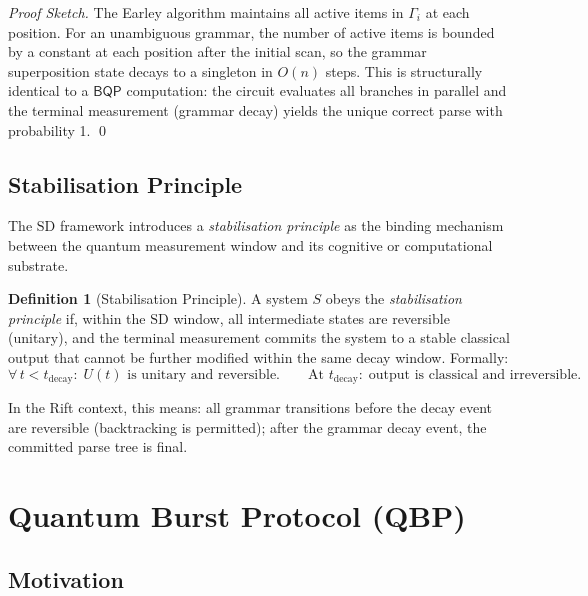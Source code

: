 \documentclass[12pt, a4paper]{article}
\theoremstyle{plain}
\theoremstyle{definition}
\newtheorem{definition}[theorem]{Definition}
\theoremstyle{remark}
\newcommand{\bqp}{\ensuremath{\mathsf{BQP}}}
\newcommand{\SD}{\ensuremath{\mathrm{SD}}}   %
\begin{document}
\begin{proof}[Proof Sketch]
  The Earley algorithm maintains all active items in $\Gamma_i$ at each
  position.  For an unambiguous grammar, the number of active items is
  bounded by a constant at each position after the initial scan, so the
  grammar superposition state decays to a singleton in $O(n)$ steps.  This
  is structurally identical to a $\bqp$ computation: the circuit evaluates
  all branches in parallel and the terminal measurement (grammar decay)
  yields the unique correct parse with probability 1. \qed
\end{proof}

\subsection{Stabilisation Principle}

The \SD{} framework introduces a \emph{stabilisation principle} as the
binding mechanism between the quantum measurement window and its cognitive
or computational substrate.

\begin{definition}[Stabilisation Principle]
  A system $S$ obeys the \emph{stabilisation principle} if, within the \SD{}
  window, all intermediate states are reversible (unitary), and the terminal
  measurement commits the system to a stable classical output that cannot be
  further modified within the same decay window.  Formally:
  \[
    \forall\, t < t_{\text{decay}}:\; U(t)\text{ is unitary and reversible.}
    \qquad
    \text{At } t_{\text{decay}}:\; \text{output is classical and irreversible.}
  \]
\end{definition}

In the Rift context, this means: all grammar transitions before the decay
event are reversible (backtracking is permitted); after the grammar decay
event, the committed parse tree is final.

\section{Quantum Burst Protocol (QBP)}
\label{sec:qbp}

\subsection{Motivation}
\end{document}
